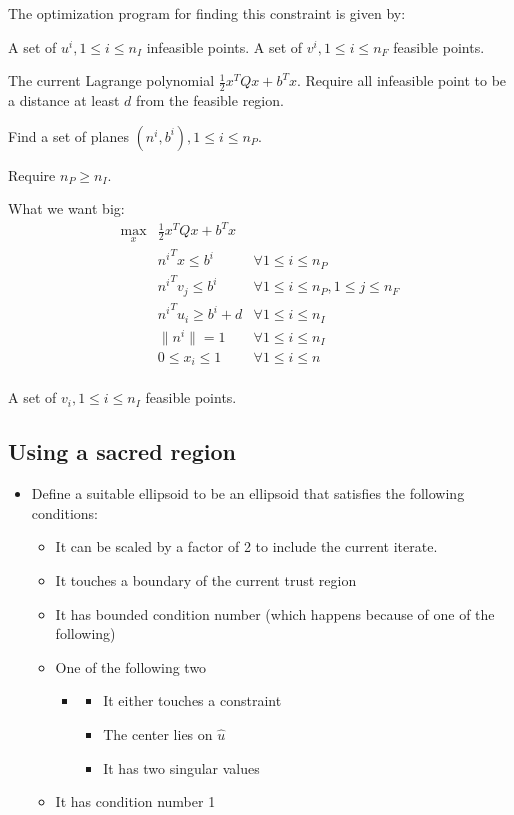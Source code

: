 The optimization program for finding this constraint is given by:

A set of $u^i, 1 \le i \le n_{I}$ infeasible points.
A set of $v^i, 1 \le i \le n_{F}$ feasible points.

The current Lagrange polynomial $\frac 1 2 x^T Q x + b^Tx$.
Require all infeasible point to be a distance at least $d$ from the feasible region.


Find a set of planes $(n^i, b^i), 1 \le i \le n_{P}$.

Require $n_P \ge n_I$.


What we want big:
\begin{align}
\max_{x} & \frac 1 2 x^T Q x + b^Tx &\\
 & {n^i}^T x \le b^i & \forall 1 \le i \le n_{P} \\
 & {n^i}^T v_j \le b^i & \forall 1 \le i \le n_{P}, 1\le j\le  n_{F} \\
 & {n^i}^T u_i \ge b^i + d & \forall 1 \le i \le n_{I} \\
 & \| n^i \| = 1 & \forall 1 \le i \le n_{I} \\
 & 0 \le x_i \le 1 & \forall 1 \le i \le n \\
\end{align}


A set of $v_i, 1 \le i \le n_{I}$ feasible points.




\subsection{Using a sacred region}


\begin{itemize}
    \item Define a suitable ellipsoid to be an ellipsoid that satisfies the following conditions: \begin{itemize}
        \item It can be scaled by a factor of 2 to include the current iterate.
        \item It touches a boundary of the current trust region
        \item It has bounded condition number (which happens because of one of the following)
        \item One of the following two  \begin{itemize}
            \item \begin{itemize}
                \item It either touches a constraint
                \item The center lies on $\hat u$
                \item It has two singular values
            \end{itemize}
        \end{itemize}
        \item It has condition number 1
    \end{itemize}
\end{itemize}



